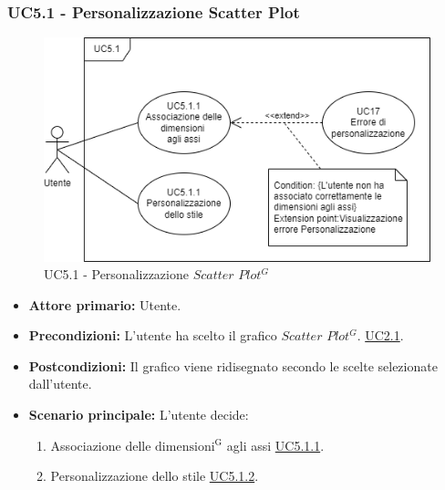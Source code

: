 \subsubsection{UC5.1 - Personalizzazione Scatter Plot}
\label{sec:UC5.1}
\begin{figure}[h!]
	\centering
	\includegraphics[scale=0.60]{../../assets/personalizzazioneScatterPlot.png}
	\caption{UC5.1 - Personalizzazione $Scatter$ $Plot^{G}$}
\end{figure}
\begin{itemize}
    \item \textbf{Attore primario:} Utente.
	\item \textbf{Precondizioni:} L'utente ha scelto il grafico $Scatter$ $Plot^{G}$. \hyperref[sec:UC2.1]{UC2.1}.
	\item \textbf{Postcondizioni:} 
	Il grafico viene ridisegnato secondo le scelte selezionate dall'utente.
	\item \textbf{Scenario principale:} L'utente decide:
	\begin{enumerate}
        \item Associazione delle ${\mathrm{dimensioni^{G}}}$ agli assi \hyperref[sec:UC5.1.1]{UC5.1.1}.
        \item Personalizzazione dello stile \hyperref[sec:UC5.1.2]{UC5.1.2}.
    \end{enumerate}
\end{itemize}
